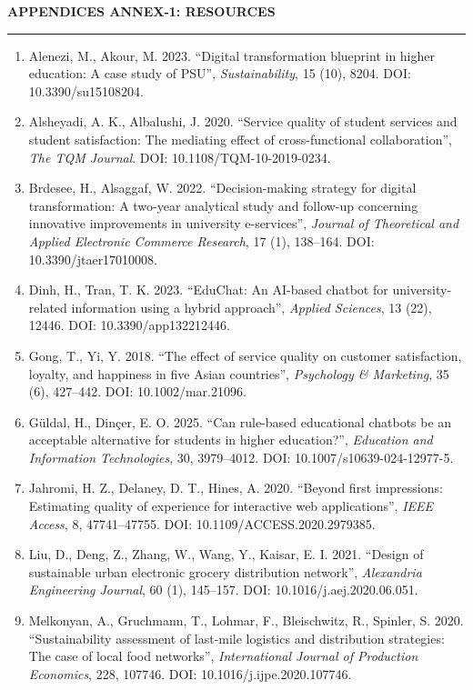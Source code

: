 \documentclass[10pt,a4paper]{article}
\newcommand{\sectionlabel}[1]{\vspace{1.2em}\noindent\textbf{\fontsize{10.5}{12}\selectfont #1}\par\vspace{0.4em}}
\newcommand{\formline}{\vspace{1em}\noindent\rule{\textwidth}{0.5pt}\vspace{1em}}
\begin{document}
\sectionlabel{APPENDICES ANNEX-1: RESOURCES}
\formline
\begin{enumerate}[leftmargin=1.4em]
\item Alenezi, M., Akour, M. 2023. ``Digital transformation blueprint in higher education: A case study of PSU'', \textit{Sustainability}, 15 (10), 8204. DOI: 10.3390/su15108204.
\item Alsheyadi, A. K., Albalushi, J. 2020. ``Service quality of student services and student satisfaction: The mediating effect of cross-functional collaboration'', \textit{The TQM Journal}. DOI: 10.1108/TQM-10-2019-0234.
\item Brdesee, H., Alsaggaf, W. 2022. ``Decision-making strategy for digital transformation: A two-year analytical study and follow-up concerning innovative improvements in university e-services'', \textit{Journal of Theoretical and Applied Electronic Commerce Research}, 17 (1), 138--164. DOI: 10.3390/jtaer17010008.
\item Dinh, H., Tran, T. K. 2023. ``EduChat: An AI-based chatbot for university-related information using a hybrid approach'', \textit{Applied Sciences}, 13 (22), 12446. DOI: 10.3390/app132212446.
\item Gong, T., Yi, Y. 2018. ``The effect of service quality on customer satisfaction, loyalty, and happiness in five Asian countries'', \textit{Psychology \& Marketing}, 35 (6), 427--442. DOI: 10.1002/mar.21096.
\item Güldal, H., Dinçer, E. O. 2025. ``Can rule-based educational chatbots be an acceptable alternative for students in higher education?'', \textit{Education and Information Technologies}, 30, 3979--4012. DOI: 10.1007/s10639-024-12977-5.
\item Jahromi, H. Z., Delaney, D. T., Hines, A. 2020. ``Beyond first impressions: Estimating quality of experience for interactive web applications'', \textit{IEEE Access}, 8, 47741--47755. DOI: 10.1109/ACCESS.2020.2979385.
\item Liu, D., Deng, Z., Zhang, W., Wang, Y., Kaisar, E. I. 2021. ``Design of sustainable urban electronic grocery distribution network'', \textit{Alexandria Engineering Journal}, 60 (1), 145--157. DOI: 10.1016/j.aej.2020.06.051.
\item Melkonyan, A., Gruchmann, T., Lohmar, F., Bleischwitz, R., Spinler, S. 2020. ``Sustainability assessment of last-mile logistics and distribution strategies: The case of local food networks'', \textit{International Journal of Production Economics}, 228, 107746. DOI: 10.1016/j.ijpe.2020.107746.

\end{enumerate}
\end{document}
